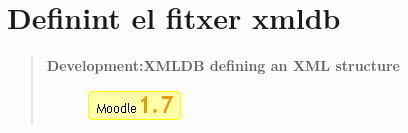 \documentclass[a4paper]{report}  %
\begin{document}
\section{Definint el fitxer xmldb}\label{annexxmldb}
\begin{otherlanguage}{english}
\begin{quote}

\begin{minipage}{10cm}
{\bfseries Development:XMLDB defining an XML structure}
\end{minipage}
\hfill
\begin{minipage}{2.51cm}
		\begin{figure}[H] %
		\begin{center}
		\includegraphics[width=2.51cm]{img/Moodle17.png}
		\label{fig:Moodle17}
		\end{center}
		\end{figure}


\end{minipage}
\end{quote}
\end{otherlanguage}
\end{document}
